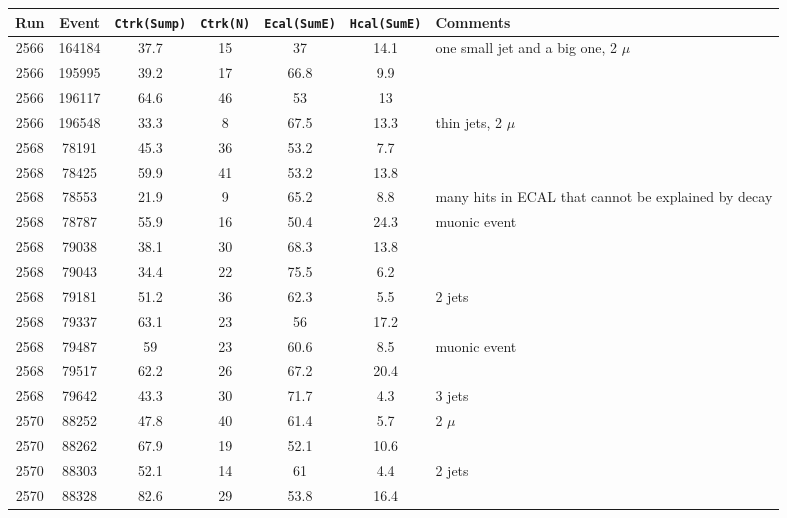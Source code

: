 \begin{tabular}{ccccccl}
	\toprule
	Run & Event & \texttt{Ctrk(Sump)} & \texttt{Ctrk(N)} & \texttt{Ecal(SumE)} & \texttt{Hcal(SumE)} & Comments \\
	\midrule
	2566 & 164184 & 37.7 & 15 & 37   & 14.1 & one small jet and a big one, 2 $\mu$ \\
	2566 & 195995 & 39.2 & 17 & 66.8 & 9.9  &  \\
	2566 & 196117 & 64.6 & 46 & 53   & 13   &  \\
	2566 & 196548 & 33.3 & 8  & 67.5 & 13.3 & thin jets, 2 $\mu$ \\
	2568 & 78191  & 45.3 & 36 & 53.2 & 7.7  & \\
	2568 & 78425  & 59.9 & 41 & 53.2 & 13.8 & \\
	2568 & 78553  & 21.9 & 9  & 65.2 & 8.8  & many hits in ECAL that cannot be explained by decay \\
	2568 & 78787  & 55.9 & 16 & 50.4 & 24.3 & muonic event \\
	2568 & 79038  & 38.1 & 30 & 68.3 & 13.8 & \\
	2568 & 79043  & 34.4 & 22 & 75.5 & 6.2  & \\
	2568 & 79181  & 51.2 & 36 & 62.3 & 5.5  & 2 jets \\
	2568 & 79337  & 63.1 & 23 & 56   & 17.2 & \\
	2568 & 79487  & 59   & 23 & 60.6 & 8.5  & muonic event  \\
	2568 & 79517  & 62.2 & 26 & 67.2 & 20.4 &  \\
	2568 & 79642  & 43.3 & 30 & 71.7 & 4.3  & 3 jets  \\
	2570 & 88252  & 47.8 & 40 & 61.4 & 5.7  & 2 $\mu$  \\
	2570 & 88262  & 67.9 & 19 & 52.1 & 10.6 &  \\
	2570 & 88303  & 52.1 & 14 & 61   & 4.4  & 2 jets  \\
	2570 & 88328  & 82.6 & 29 & 53.8 & 16.4 & \\
	\bottomrule
\end{tabular}